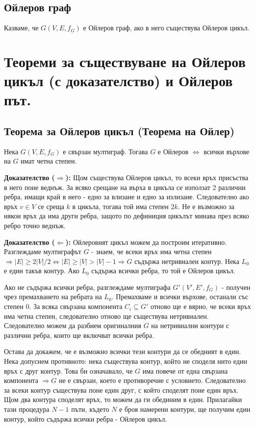 \documentclass[fleqn,12pt]{article}
\begin{document}
\subsection{Ойлеров граф} 
Казваме, че $G(V,E,f_G)$ е Ойлеров граф, ако в него съществува Ойлеров цикъл.

\section{Теореми за съществуване на Ойлеров цикъл (с доказателство) и Ойлеров път.}

\subsection{Теорема за Ойлеров цикъл (Теорема на Ойлер)} 
Нека $G(V,E,f_G)$ е свързан мултиграф. Тогава $G$ е Ойлеров $\Leftrightarrow$
всички върхове на $G$ имат четна степен.

\textbf{Доказателство ($\Rightarrow$): } Щом съществува Ойлеров цикъл, то всеки връх присъства в него поне веднъж.
За всяко срещане на върха в цикъла се използат 2 различни ребра, имащи край в него - едно за влизане и едно за излизане.
Следователно ако връх $v \in V$ се среща $k$ в цикъла, тогава той има степен $2k$. Не е възможно за някои връх да има други ребра, 
защото по дефиниция цикълът минава през всяко ребро точно веднъж.

\textbf{Доказателство ($\Leftarrow$): } Ойлеровият цикъл можем да построим итеративно. 
Разглеждаме мултиграфът $G$ - знаем, че всеки връх има четна степен $\Rightarrow |E| \geq 2 |V| / 2 \Leftrightarrow |E| \geq |V| > |V| - 1 \Rightarrow G$ съдържа нетривиален контур.  
Нека $L_0$ е един такъв контур. Ако $L_0$ съдържа всички ребра, то той е Ойлеров цикъл. 

Ако не съдържа всички ребра, разглеждаме мултиграфа $G'(V', E', f_G)$ - получен чрез премахването на ребрата на $L_0$. 
Премахваме и всички върхове, останали със степен 0. За всяка свързана компонента $C_i \subseteq G'$ отново ще е вярно,
че всеки връх има четна степен, следователно отново ще съществува нетривиален. Следователно можем да разбием оригиналния
$G$ на нетривиални контури с различни ребра, които ще включват всички ребра. 

Остава да докажем, че е възможно всички тези контури да се обедният в един. Нека допуснем противното: нека съществува контур,
който не споделя нито един връх с друг контур. Това би означавало, че $G$ има повече от една свързана компонента 
$\Rightarrow G$ не е свързан, което е противоречие с условието. Следователно за всеки контур съществува поне един друг,
с който споделят поне един връх. Щом два контура споделят връх, то можем да ги обединим в един. Прилагайки тази процедура
$N - 1$ пъти, където $N$ е броя намерени контури, ще получим един контур, който съдържа всички ребра - Ойлеров цикъл. 
\vspace{10mm}
\end{document}

